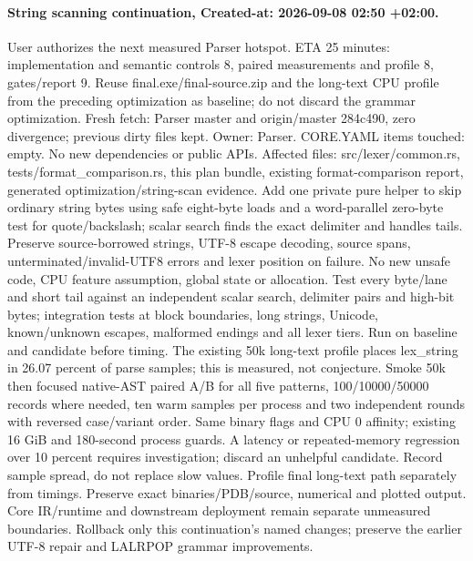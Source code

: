 \documentclass[11pt,a4paper]{article}
\begin{document}
\paragraph{String scanning continuation, Created-at: 2026-09-08 02:50 +02:00.}
User authorizes the next measured Parser hotspot. ETA 25 minutes: implementation
and semantic controls 8, paired measurements and profile 8, gates/report 9.
Reuse final.exe/final-source.zip and the long-text CPU profile from the preceding
optimization as baseline; do not discard the grammar optimization. Fresh fetch:
Parser master and origin/master 284c490, zero divergence; previous dirty files kept.
Owner: Parser. CORE.YAML items touched: empty. No new dependencies or public APIs.
Affected files: src/lexer/common.rs, tests/format\_comparison.rs, this plan bundle,
existing format-comparison report, generated optimization/string-scan evidence.
Add one private pure helper to skip ordinary string bytes using safe eight-byte
loads and a word-parallel zero-byte test for quote/backslash; scalar search finds
the exact delimiter and handles tails. Preserve source-borrowed strings, UTF-8
escape decoding, source spans, unterminated/invalid-UTF8 errors and lexer position
on failure. No new unsafe code, CPU feature assumption, global state or allocation.
Test every byte/lane and short tail against an independent scalar search, delimiter
pairs and high-bit bytes; integration tests at block boundaries, long strings,
Unicode, known/unknown escapes, malformed endings and all lexer tiers. Run on
baseline and candidate before timing. The existing 50k long-text profile places
lex\_string in 26.07 percent of parse samples; this is measured, not conjecture.
Smoke 50k then focused native-AST paired A/B for all five patterns, 100/10000/50000
records where needed, ten warm samples per process and two independent rounds
with reversed case/variant order. Same binary flags and CPU 0 affinity; existing
16 GiB and 180-second process guards. A latency or repeated-memory regression over
10 percent requires investigation; discard an unhelpful candidate. Record sample
spread, do not replace slow values. Profile final long-text path separately from
timings. Preserve exact binaries/PDB/source, numerical and plotted output. Core
IR/runtime and downstream deployment remain separate unmeasured boundaries.
Rollback only this continuation's named changes; preserve the earlier UTF-8 repair
and LALRPOP grammar improvements.
\end{document}
